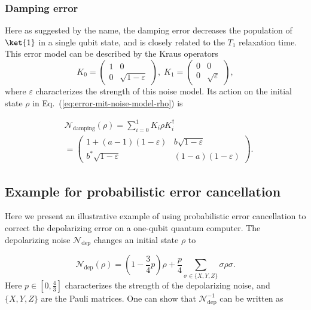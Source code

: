 \subsubsection{Damping error}

Here as suggested by the name, the damping error decreases the population of $\ket{1}$ in a single qubit state, and is closely related to the $T_1$ relaxation time.
This error model can be described by the Kraus operators
\begin{equation}
    K_{0} =\begin{pmatrix}
        1 & 0                     \\
        0 & \sqrt{1-\varepsilon }
    \end{pmatrix},\;
    K_{1} =\begin{pmatrix}
        0 & 0                   \\
        0 & \sqrt{\varepsilon }
    \end{pmatrix},
\end{equation}
where $\varepsilon$ characterizes the strength of this noise model. Its action on the initial state $\rho$ in Eq.~(\ref{eq:error-mit-noise-model-rho}) is

\begin{equation}
    \begin{split}
        & \mathcal{N}_{\mathrm{damping}}(\rho) = \sum_{i=0}^1 K_i \rho K_i^\dagger \\
        & = \begin{pmatrix}
            1+(a-1)(1-\varepsilon )    & b\sqrt{1-\varepsilon } \\
            b^{*}\sqrt{1-\varepsilon } & (1-a)(1-\varepsilon )
        \end{pmatrix}.
    \end{split}
\end{equation}

\subsection{Example for probabilistic error cancellation}
\label{sec:mit-pec-toy-example}

Here we present an illustrative example of using probabilistic error cancellation to correct the depolarizing error on a one-qubit quantum computer. The depolarizing noise $\mathcal{N}_{\mathrm{dep}}$ changes an initial state $\rho$ to

\begin{equation}
    \label{eq:mit-pec-2}
    \mathcal{N}_{\mathrm{dep}}( \rho ) =\left( 1-\frac{3}{4} p\right) \rho +\frac{p}{4}\sum _{\sigma \in \{X,Y,Z\}} \sigma \rho \sigma .
\end{equation}
Here $p\in \left[ 0,\frac{4}{3}\right]$ characterizes the strength of the depolarizing noise, and $\{X,Y,Z\}$ are the Pauli matrices. One can show that $\mathcal{N}^{-1}_{\mathrm{dep}}$ can be written as~\cite{temmeErrorMitigationShortDepth2017}

